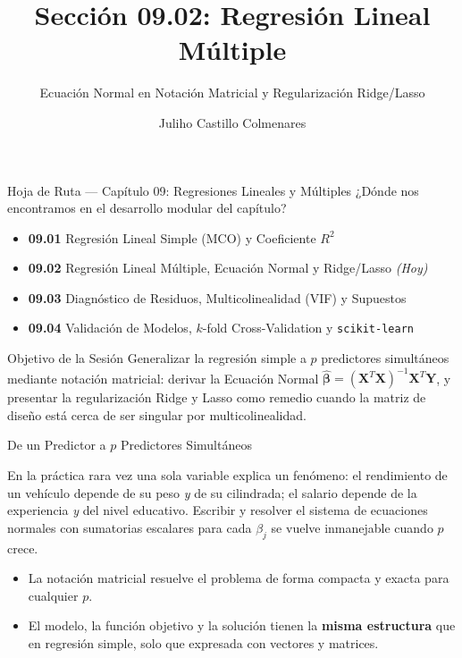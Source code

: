 \documentclass[10pt, aspectratio=169]{beamer}
\title[Regresión Múltiple]{Sección 09.02: Regresión Lineal Múltiple}
\subtitle{Ecuación Normal en Notación Matricial y Regularización Ridge/Lasso}
\author[J. Castillo Colmenares]{Juliho Castillo Colmenares}
\institute{Tecnológico de Monterrey}
\date{\vspace{-1.2cm}}
\begin{document}
\begin{frame}[plain]
  \titlepage
\end{frame}

\begin{frame}{Hoja de Ruta --- Capítulo 09: Regresiones Lineales y Múltiples}
  \footnotesize
  ¿Dónde nos encontramos en el desarrollo modular del capítulo? \pause
  \begin{itemize}\itemsep=0.08em
    \item \textbf{09.01} Regresión Lineal Simple (MCO) y Coeficiente $R^2$ \pause
    \item \textbf{09.02} Regresión Lineal Múltiple, Ecuación Normal y Ridge/Lasso \emph{(Hoy)} \pause
    \item \textbf{09.03} Diagnóstico de Residuos, Multicolinealidad (VIF) y Supuestos \pause
    \item \textbf{09.04} Validación de Modelos, $k$-fold Cross-Validation y \texttt{scikit-learn}
  \end{itemize}
  \vspace{-0.05cm}
  \begin{block}{Objetivo de la Sesión}
    Generalizar la regresión simple a $p$ predictores simultáneos mediante notación matricial: derivar la Ecuación Normal $\hat{\boldsymbol\beta}=(\mathbf{X}^T\mathbf{X})^{-1}\mathbf{X}^T\mathbf{Y}$, y presentar la regularización Ridge y Lasso como remedio cuando la matriz de diseño está cerca de ser singular por multicolinealidad.
  \end{block}
\end{frame}

\begin{frame}{De un Predictor a $p$ Predictores Simultáneos}
  \footnotesize
  \begin{motivacion}
    En la práctica rara vez una sola variable explica un fenómeno: el rendimiento de un vehículo depende de su peso \emph{y} de su cilindrada; el salario depende de la experiencia \emph{y} del nivel educativo. Escribir y resolver el sistema de ecuaciones normales con sumatorias escalares para cada $\beta_j$ se vuelve inmanejable cuando $p$ crece.
  \end{motivacion}

  \vspace{0.15cm}
  \pause
  \begin{itemize}\itemsep=0.1cm
    \item La notación matricial resuelve el problema de forma compacta y exacta para cualquier $p$. \pause
    \item El modelo, la función objetivo y la solución tienen la \textbf{misma estructura} que en regresión simple, solo que expresada con vectores y matrices.
  \end{itemize}
\end{frame}
\end{document}
